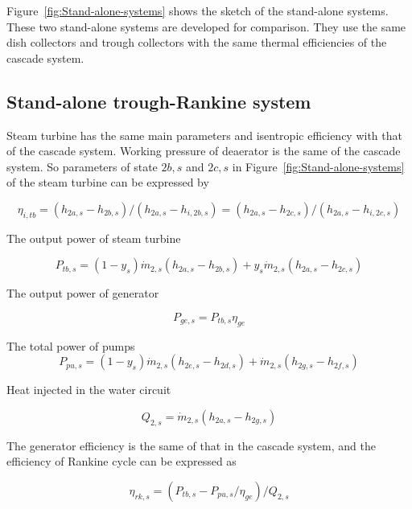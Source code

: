 Figure~\ref{fig:Stand-alone-systems} shows the sketch of the stand-alone systems. These two stand-alone systems are developed for comparison. They use the same dish collectors and trough collectors with the same thermal efficiencies of the cascade system.

\subsection{Stand-alone trough-Rankine system}

Steam turbine has the same main parameters and isentropic efficiency with that of the cascade system. Working pressure of deaerator is the same of the cascade system. So parameters of state $2b,s$ and $2c,s$ in Figure~\ref{fig:Stand-alone-systems} of the steam turbine can be expressed by

\begin{equation}
	\eta_{i,tb}= (h_{2a,s}-h_{2b,s})/(h_{2a,s}-h_{i,2b,s}) = (h_{2a,s}-h_{2c,s})/(h_{2a,s}-h_{i,2c,s})
\end{equation}

The output power of steam turbine

\begin{equation}
	P_{tb,s}=\left(1-y_{s}\right)\dot{m}_{2,s}\left(h_{2a,s}-h_{2b,s}\right)+y_{s}\dot{m}_{2,s}\left(h_{2a,s}-h_{2c,s}\right)
\end{equation}

The output power of generator

\begin{equation}
	P_{ge,s}=P_{tb,s}\eta_{ge}
\end{equation}

The total power of pumps
\begin{equation}
	P_{pu,s}=\left(1-y_{s}\right)\dot{m}_{2,s}\left(h_{2e,s}-h_{2d,s}\right)+\dot{m}_{2,s}\left(h_{2g,s}-h_{2f,s}\right)
\end{equation}

Heat injected in the water circuit

\begin{equation}
	Q_{2,s}=\dot{m}_{2,s}\left(h_{2a,s}-h_{2g,s}\right)
\end{equation}

The generator efficiency is the same of that in the cascade system, and the efficiency of Rankine cycle can be expressed as

\begin{equation}
	\eta_{rk,s}=(P_{tb,s}-P_{pu,s}/\eta_{ge})/Q_{2,s}
\end{equation}

